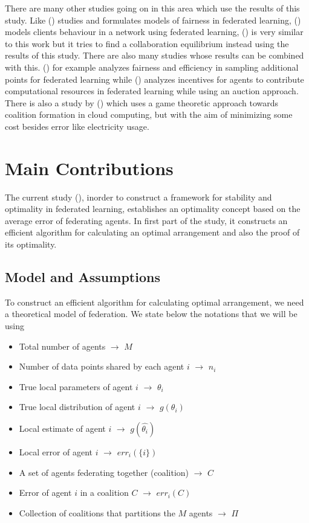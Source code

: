 \documentclass{article}
\begin{document}
There are many other studies going on in this area which use the results of this study. Like (\cite{donahue2021fair}) studies and formulates models of fairness in federated learning, (\cite{hu2023network}) models clients behaviour in a network using federated learning, (\cite{cui2021}) is very similar to this work but it tries to find a collaboration equilibrium instead using the results of this study. There are also many studies whose results can be combined with this. (\cite{blum2021one}) for example analyzes fairness and efficiency in sampling additional points for federated learning while (\cite{incentivemech}) analyzes incentives for agents to contribute computational resources in federated learning while using an auction approach. There is also a study by (\cite{Anglano2018AGA}) which uses a game theoretic approach towards coalition formation in cloud computing, but with the aim of minimizing some cost besides error like electricity usage.

\section{Main Contributions}

The current study (\cite{donahue2021opt}), inorder to construct a framework for stability and optimality in federated learning, establishes an optimality concept based on the average error of federating agents. In first part of the study, it constructs an efficient algorithm for calculating an optimal arrangement and also the proof of its optimality.

\subsection{Model and Assumptions}

To construct an efficient algorithm for calculating optimal arrangement, we need a theoretical model of federation. We state below the notations that we will be using

\begin{itemize}
\item Total number of agents $\rightarrow$ $M$
\item Number of data points shared by each agent $i$ $\rightarrow$ $n_i$
\item True local parameters of agent $i$ $\rightarrow$ $\theta_i$
\item True local distribution of agent $i$ $\rightarrow$ $g(\theta_i)$
\item Local estimate of agent $i$ $\rightarrow$ $g(\hat{\theta_i})$
\item Local error of agent $i$ $\rightarrow$ $err_i(\{i\})$
\item A set of agents federating together (coalition) $\rightarrow$ $C$
\item Error of agent $i$ in a coalition $C$ $\rightarrow$ $err_i(C)$
  
\item Collection of coalitions that partitions the $M$ agents $\rightarrow$ $\Pi$
\end{itemize}
\end{document}
